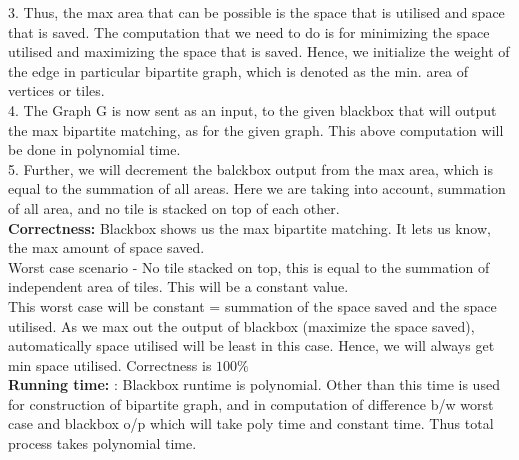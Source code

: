 \documentclass[11pt]{article}
\newcommand\correctness{\vspace{.10in}\textbf{Correctness: }}
\newcommand\runtime{\vspace{.10in}\textbf{Running time: }}
\begin{document}
3. Thus, the max area that can be possible is the space that is utilised and space that is saved. The computation that we need to do is for minimizing the space utilised and maximizing the space that is saved. Hence, we initialize the weight of the edge in particular bipartite graph, which is denoted as the min. area of vertices or tiles.\\ 

4. The Graph G is now sent as an input, to the given blackbox that will output the max bipartite matching, as for the given graph. This above computation will be done in polynomial time.\\

5. Further, we will decrement the balckbox output from the max area, which is equal to the summation of all areas. Here we are taking into account, summation of all area, and no tile is stacked on top of each other.\\ 

\correctness Blackbox shows us the max bipartite matching. It lets us know, the max amount of space saved.\\
Worst case scenario - No tile stacked on top, this is equal to the summation of independent area of tiles. This will be a constant value.\\
This worst case will be constant = summation of the space saved and the space utilised. As we max out the output of blackbox (maximize the space saved), automatically space utilised will be least in this case. Hence, we will always get min space utilised. Correctness is $100\%$\\  

\runtime: Blackbox runtime is polynomial. Other than this time is used for construction of bipartite graph, and in computation of difference b/w worst case and blackbox o/p which will take poly time and constant time. Thus total process takes polynomial time.\\
\end{document}
